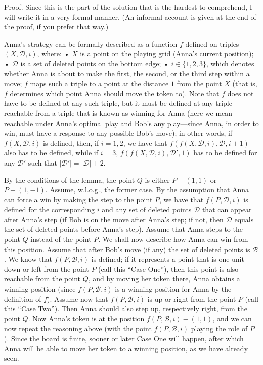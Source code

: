 {    Proof. Since this is the part of the solution that is the hardest to comprehend, I will write it in a very formal manner. (An informal account is given at the end of the proof, if you prefer that way.)

    Anna's strategy can be formally described as a function $f$ defined on triples $(X,{\mathcal D},i)$, where:
    • $X$ is a point on the playing grid (Anna's current position);
    • $\mathcal D$ is a set of deleted points on the bottom edge;
    • $i\in\{1,2,3\}$, which denotes whether Anna is about to make the first, the second, or the third step within a move;
    $f$ maps such a triple to a point at the distance $1$ from the point $X$ (that is, $f$ determines which point Anna should move the token to). Note that $f$ does not have to be defined at any such triple, but it must be defined at any triple reachable from a triple that is known as winning for Anna (here we mean reachable under Anna's optimal play and Bob's any play---since Anna, in order to win, must have a response to any possible Bob's move); in other words, if $f(X,\mathcal D,i)$ is defined, then, if $i=1,2$, we have that $f(f(X,\mathcal D,i),\mathcal D,i+1)$ also has to be defined, while if $i=3$, $f(f(X,\mathcal D,i),\mathcal D',1)$ has to be defined for any $\mathcal D'$ such that $|\mathcal D'|=|\mathcal D|+2$.

    By the conditions of the lemma, the point $Q$ is either $P-(1,1)$ or $P+(1,-1)$. Assume, w.l.o.g., the former case. By the assumption that Anna can force a win by making the step to the point $P$, we have that $f(P,\mathcal D,i)$ is defined for the corresponding $i$ and any set of deleted points $\mathcal D$ that can appear after Anna's step (if Bob is on the move after Anna's step; if not, then $\mathcal D$ equals the set of deleted points before Anna's step). Assume that Anna steps to the point $Q$ instead of the point $P$. We shall now describe how Anna can win from this position. Assume that after Bob's move (if any) the set of deleted points is $\mathcal B$. We know that $f(P,\mathcal B,i)$ is defined; if it represents a point that is one unit down or left from the point $P$ (call this “Case One”), then this point is also reachable from the point $Q$, and by moving her token there, Anna obtains a winning position (since $f(P,\mathcal B,i)$ is a winning position for Anna by the definition of $f$). Assume now that $f(P,\mathcal B,i)$ is up or right from the point $P$ (call this “Case Two”). Then Anna should also step up, respectively right, from the point $Q$. Now Anna's token is at the position $f(P,\mathcal B,i)-(1,1)$, and we can now repeat the reasoning above (with the point $f(P,\mathcal B,i)$ playing the role of $P$). Since the board is finite, sooner or later Case One will happen, after which Anna will be able to move her token to a winning position, as we have already seen.

}
